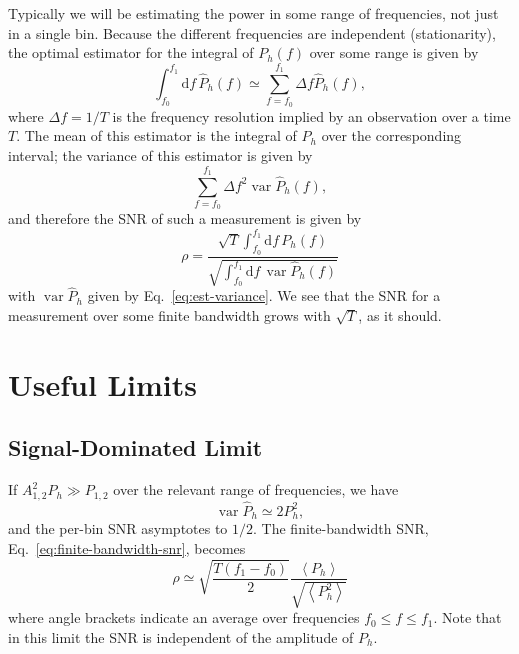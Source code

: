 \documentclass[modern]{aastex63}
\DeclareMathOperator{\var}{var}
\newcommand{\dd}{\mathrm{d}}
\begin{document}
Typically we will be estimating the power in some range of frequencies, not just
in a single bin.  Because the different frequencies are independent
(stationarity), the optimal estimator for the integral of $P_h(f)$ over some
range is given by
%
\begin{equation}
  \int_{f_0}^{f_1} \dd f \, \hat{P}_h(f) \simeq \sum_{f = f_0}^{f_1} \Delta f \hat{P}_h(f),
\end{equation}
%
where $\Delta f = 1/T$ is the frequency resolution implied by an observation
over a time $T$.   The mean of this estimator is the integral of $P_h$ over the
corresponding interval; the variance of this estimator is given by
%
\begin{equation}
  \sum_{f = f_0}^{f_1} \Delta f^2 \var \hat{P}_h(f),
\end{equation}
%
and therefore the \ac{SNR} of such a measurement is given by
%
\begin{equation}
  \label{eq:finite-bandwidth-snr}
  \rho = \frac{\sqrt{T} \int_{f_0}^{f_1} \dd f \, P_h\left( f \right)}{\sqrt{\int_{f_0}^{f_1} \dd f \, \var \hat{P}_h(f)}}
\end{equation}
%
with $\var \hat{P}_h$ given by Eq.\ \eqref{eq:est-variance}.  We see that the
\ac{SNR} for a measurement over some finite bandwidth grows with $\sqrt{T}$, as
it should.

\section{Useful Limits}

\subsection{Signal-Dominated Limit}

If $A^2_{1,2} P_h \gg P_{1,2}$ over the relevant range of frequencies, we have
%
\begin{equation}
  \var \hat{P}_h \simeq 2 P_h^2,
\end{equation}
%
and the per-bin \ac{SNR} asymptotes to $1/2$.  The finite-bandwidth \ac{SNR},
Eq.\ \eqref{eq:finite-bandwidth-snr}, becomes
%
\begin{equation}
  \rho \simeq \sqrt{\frac{T \left( f_1 - f_0 \right)}{2}} \frac{\left\langle P_h \right\rangle}{\sqrt{\left\langle P_h^2 \right\rangle}}
\end{equation}
%
where angle brackets indicate an average over frequencies $f_0 \leq f \leq f_1$.
Note that in this limit the \ac{SNR} is independent of the amplitude of $P_h$.
\end{document}
